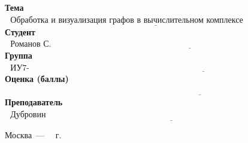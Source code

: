 \begin{titlepage}
	\vspace{1cm}
	
	\noindent\textbf{Тема} $\underline{\text{~~Обработка и визуализация графов в вычислительном комплексе Тераграф~~~~~~~~~~~~~~~~~~~~~~~~~~~~~~~~~~~}}$\newline\newline
	\noindent\textbf{Студент} $\underline{\text{~~Романов С. К.~~~~~~~~~~~~~~~~~~~~~~~~~~~~~~~~~~~~~~~~~~~~~~~~~~~~~~~~~~~~~~~~~~~~~~~~~~~~~~~~~~~~~~~~~~~~~~~~~~~~~~~~~~~~~~~~~~~~~~~~~~~~~~~~~~}}$\newline\newline
	\noindent\textbf{Группа} $\underline{\text{~~ИУ7-55Б~~~~~~~~~~~~~~~~~~~~~~~~~~~~~~~~~~~~~~~~~~~~~~~~~~~~~~~~~~~~~~~~~~~~~~~~~~~~~~~~~~~~~~~~~~~~~~~~~~~~~~~~~~~~~~~~~~~~~~~~~~~~~~~~~~~~~~~~~~}}$\newline\newline
	\noindent\textbf{Оценка (баллы)} $\underline{\text{~~~~~~~~~~~~~~~~~~~~~~~~~~~~~~~~~~~~~~~~~~~~~~~~~~~~~~~~~~~~~~~~~~~~~~~~~~~~~~~~~~~~~~~~~~~~~~~~~~~~~~~~~~~~~~~~~~~~~~~~~~~~~~~~~~~~~~~~~~~~}}$\newline\newline
	\noindent\textbf{Преподаватель} $\underline{\text{~~Дубровин Е.Н.~~~~~~~~~~~~~~~~~~~~~~~~~~~~~~~~~~~~~~~~~~~~~~~~~~~~~~~~~~~~~~~~~~~~~~~~~~~~~~~~~~~~~~~~~~~~~~~~~~~~~~~~~~~~~~~~~~}}$\newline
	
	\begin{center}
		\vfill
		Москва~---~\the\year
		~г.
	\end{center}
	\restoregeometry
\end{titlepage}


